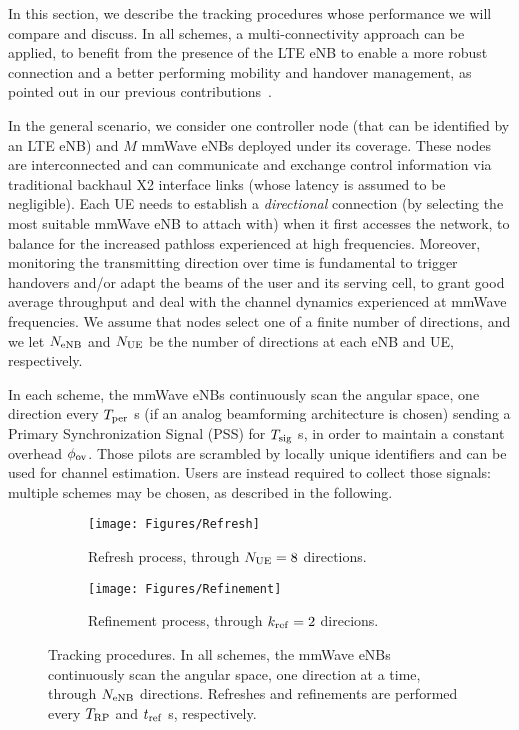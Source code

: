 \documentclass[conference]{IEEEtran}
\begin{document}
 
In this section, we  describe the tracking procedures whose performance we will compare and discuss. 
In all schemes, a
multi-connectivity approach can be applied, to benefit from the
presence of the LTE eNB to enable a more robust connection
and a better performing mobility and handover management,
as pointed out in our previous contributions~\cite{giordani_MedHoc2016,giordani2016uplink, JSAC_2017}.

In the general scenario, we consider one controller node (that can be identified by an LTE eNB) and $M$ mmWave eNBs deployed under its coverage.
These nodes are interconnected and can communicate and exchange control information via traditional backhaul X2 interface links (whose latency is assumed to be negligible).
Each UE needs to establish a \emph{directional} connection (by selecting the most suitable mmWave eNB to attach with)  when it first accesses the network, to balance for the increased pathloss experienced at high frequencies.
Moreover, monitoring the transmitting direction over time is fundamental to trigger handovers and/or adapt the beams of the user and its serving cell, to grant good average
throughput and deal with the channel dynamics experienced at mmWave frequencies.
We assume that nodes select one of a finite number of directions, and we let
$N_{\rm eNB}$ and $N_{\rm UE}$ be the number of directions at each  eNB and
UE, respectively.



In each scheme, the mmWave eNBs continuously scan the angular space, one direction every  $T_{\rm per}$ s (if an analog beamforming architecture is chosen) sending a Primary Synchronization Signal (PSS) for   $T_{\rm sig}$ s, in order to maintain a constant overhead $\phi_{\rm ov}$. Those pilots are scrambled by locally unique identifiers and can be used for channel estimation.
Users are instead required to collect those signals: multiple schemes may be chosen, as described in the following.

\begin{figure}[t]
  \centering
  \begin{subfigure}[t]{0.4\columnwidth}
    \texttt{[image: Figures/Refresh]}
    \caption{Refresh process,  through $N_{\rm UE}=8$ directions.}
          \label{fig:procedures_PR}
  \end{subfigure}\quad \quad
  \begin{subfigure}[t]{0.4\columnwidth}
 \texttt{[image: Figures/Refinement]}
      \caption{Refinement process, through $k_{\rm ref} = 2$ direcions.}
         \label{fig:procedures_PRaR}
  \end{subfigure}
  \vspace{0.5cm}
  \caption{Tracking procedures. In all schemes, the mmWave eNBs continuously scan the angular space, one direction at a time, through $N_{\rm eNB}$ directions. Refreshes and refinements are performed every $T_{\rm RP}$ and $t_{\rm ref}$ s, respectively.} 
\end{figure}
\end{document}
